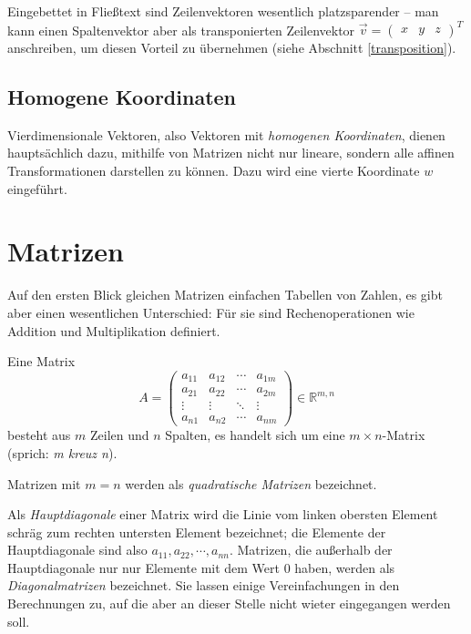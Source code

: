 Eingebettet in Fließtext sind Zeilenvektoren wesentlich platzsparender -- man kann einen Spaltenvektor aber als transponierten Zeilenvektor $\vec{v} = \begin{pmatrix} x & y & z \end{pmatrix}^T$ anschreiben, um diesen Vorteil zu übernehmen (siehe Abschnitt \ref{transposition}).


\subsection{Homogene Koordinaten}
Vierdimensionale Vektoren, also Vektoren mit \emph{homogenen Koordinaten}, dienen hauptsächlich dazu, mithilfe von Matrizen nicht nur lineare, sondern alle affinen Transformationen darstellen zu können.
Dazu wird eine vierte Koordinate $w$ eingeführt.


\section{Matrizen}
Auf den ersten Blick gleichen Matrizen einfachen Tabellen von Zahlen, es gibt aber einen wesentlichen Unterschied: Für sie sind Rechenoperationen wie Addition und Multiplikation definiert.

Eine Matrix
\begin{equation}
 A = \begin{pmatrix}
   a_{11} & a_{12} & \cdots & a_{1m}\\
   a_{21} & a_{22} & \cdots & a_{2m}\\
   \vdots & \vdots & \ddots & \vdots\\
   a_{n1} & a_{n2} & \cdots & a_{nm}
 \end{pmatrix}
 \in \mathbb R^{m,n}
\end{equation}
besteht aus $m$ Zeilen und $n$ Spalten, es handelt sich um eine $m \times n$-Matrix (sprich: \emph{m kreuz n}).

Matrizen mit $m = n$ werden als \emph{quadratische Matrizen} bezeichnet.

Als \emph{Hauptdiagonale} einer Matrix wird die Linie vom linken obersten Element schräg zum rechten untersten Element bezeichnet; die Elemente der Hauptdiagonale sind also $a_{11}, a_{22}, \cdots, a_{nn}$. Matrizen, die außerhalb der Hauptdiagonale nur nur Elemente mit dem Wert 0 haben, werden als \emph{Diagonalmatrizen} bezeichnet. Sie lassen einige Vereinfachungen in den Berechnungen zu, auf die aber an dieser Stelle nicht wieter eingegangen werden soll.

